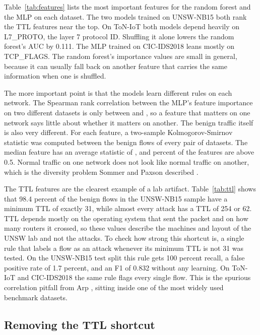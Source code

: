 Table~\ref{tab:features} lists the most important features for the random forest and the MLP on each dataset. The two models trained on UNSW-NB15 both rank the TTL features near the top. On ToN-IoT both models depend heavily on L7\_PROTO, the layer 7 protocol ID. Shuffling it alone lowers the random forest's AUC by 0.111. The MLP trained on CIC-IDS2018 leans mostly on TCP\_FLAGS. The random forest's importance values are small in general, because it can usually fall back on another feature that carries the same information when one is shuffled.

The more important point is that the models learn different rules on each network. The Spearman rank correlation between the MLP's feature importance on two different datasets is only between \SPMLPMIN{} and \SPMLPMAX{}, so a feature that matters on one network says little about whether it matters on another. The benign traffic itself is also very different. For each feature, a two-sample Kolmogorov-Smirnov statistic was computed between the benign flows of every pair of datasets. The median feature has an average statistic of \KSMED{}, and \KSSHARE{} percent of the features are above 0.5. Normal traffic on one network does not look like normal traffic on another, which is the diversity problem Sommer and Paxson described \cite{sommer2010}.

The TTL features are the clearest example of a lab artifact. Table~\ref{tab:ttl} shows that 98.4 percent of the benign flows in the UNSW-NB15 sample have a minimum TTL of exactly 31, while almost every attack has a TTL of 254 or 62. TTL depends mostly on the operating system that sent the packet and on how many routers it crossed, so these values describe the machines and layout of the UNSW lab and not the attacks. To check how strong this shortcut is, a single rule that labels a flow as an attack whenever its minimum TTL is not 31 was tested. On the UNSW-NB15 test split this rule gets 100 percent recall, a false positive rate of 1.7 percent, and an F1 of 0.832 without any learning. On ToN-IoT and CIC-IDS2018 the same rule flags every single flow. This is the spurious correlation pitfall from Arp \etal \cite{arp2022}, sitting inside one of the most widely used benchmark datasets.

\subsection{Removing the TTL shortcut}


